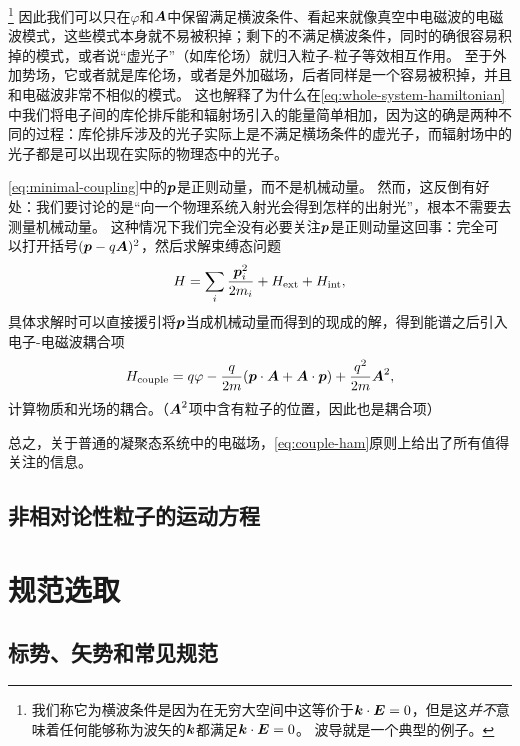 \footnote{
    我们称它为横波条件是因为在无穷大空间中这等价于$\vb*{k} \cdot \vb*{E} = 0$，但是这\emph{并不}意味着任何能够称为波矢的$\vb*{k}$都满足$\vb*{k} \cdot \vb*{E} = 0$。
    波导就是一个典型的例子。
}%
因此我们可以只在$\varphi$和$\vb*{A}$中保留满足横波条件、看起来就像真空中电磁波的电磁波模式，这些模式本身就不易被积掉；剩下的不满足横波条件，同时的确很容易积掉的模式，或者说“虚光子”（如库伦场）就归入粒子-粒子等效相互作用。
至于外加势场，它或者就是库伦场，或者是外加磁场，后者同样是一个容易被积掉，并且和电磁波非常不相似的模式。
这也解释了为什么在\eqref{eq:whole-system-hamiltonian}中我们将电子间的库伦排斥能和辐射场引入的能量简单相加，因为这的确是两种不同的过程：库伦排斥涉及的光子实际上是不满足横场条件的虚光子，而辐射场中的光子都是可以出现在实际的物理态中的光子。

\eqref{eq:minimal-coupling}中的$\vb*{p}$是正则动量，而不是机械动量。
然而，这反倒有好处：我们要讨论的是“向一个物理系统入射光会得到怎样的出射光”，根本不需要去测量机械动量。
这种情况下我们完全没有必要关注$\vb*{p}$是正则动量这回事：完全可以打开括号$(\vb*{p} - q \vb*{A})^2$，然后求解束缚态问题
\begin{equation}
    H = \sum_i \frac{\vb*{p}_i^2}{2m_i} + H_\text{ext} + H_\text{int},
    \label{eq:levels-ham}
\end{equation}
具体求解时可以直接援引将$\vb*{p}$当成机械动量而得到的现成的解，得到能谱之后引入电子-电磁波耦合项
\begin{equation}
    H_\text{couple} = q \varphi - \frac{q}{2m} (\vb*{p} \cdot \vb*{A} + \vb*{A} \cdot \vb*{p}) + \frac{q^2}{2m} \vb*{A}^2,
    \label{eq:couple-ham}
\end{equation}
计算物质和光场的耦合。（$\vb*{A}^2$项中含有粒子的位置，因此也是耦合项）

总之，关于普通的凝聚态系统中的电磁场，\eqref{eq:couple-ham}原则上给出了所有值得关注的信息。

\subsection{非相对论性粒子的运动方程}

\section{规范选取}

\subsection{标势、矢势和常见规范}

